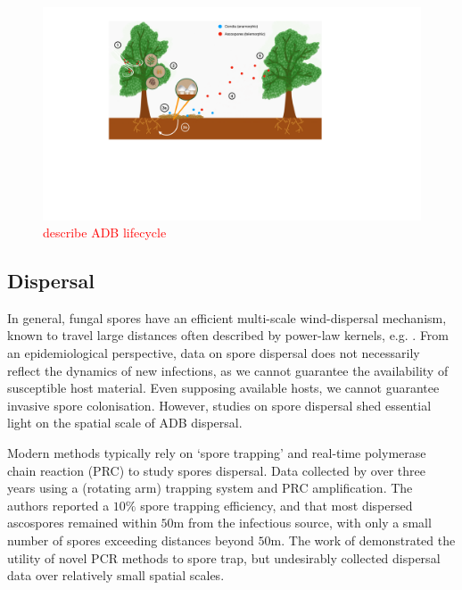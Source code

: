 \begin{figure}
    \centering
    \includegraphics[scale=0.425]{chapter2/figures/ash-dieback-illustration.pdf}
    \caption{\textcolor{red}{describe ADB lifecycle} \blindtext }
    \label{fig:my_label}
\end{figure}

\newpage

\subsection{Dispersal}

In general, fungal spores have an efficient multi-scale wind-dispersal mechanism,
known to travel large distances \cite{golan2017long, wingen2013long, mundt2009aerial}
often described by power-law kernels, e.g. \cite{shaw2006assembling}.
From an epidemiological perspective, data on spore dispersal does not necessarily reflect the dynamics of new infections, 
as we cannot guarantee the availability of susceptible host material.
Even supposing available hosts, we cannot guarantee invasive spore colonisation.
However, studies on spore dispersal shed essential light on the spatial scale of ADB dispersal. 

Modern methods typically rely on `spore trapping' and real-time polymerase chain reaction (PRC) to study spores dispersal.
Data collected by \cite{chandelier2014detection} over three years using a (rotating arm) trapping system
and PRC amplification. The authors reported a $10\%$ spore trapping efficiency, and that most
dispersed ascospores remained within $50\mathrm{m}$ from the infectious source, with only a small number of spores exceeding 
distances beyond $50\mathrm{m}$. The work of \cite{chandelier2014detection} demonstrated the utility of novel PCR methods
to spore trap, but undesirably collected dispersal data over relatively small spatial scales.

